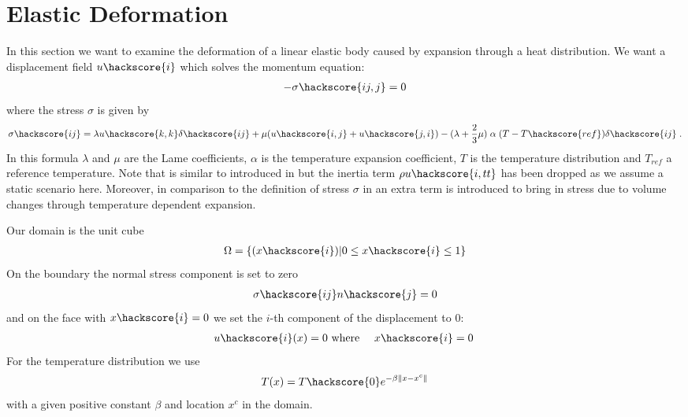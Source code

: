 
%
%
%


\section{Elastic Deformation}
\label{ELASTIC CHAP}
In this section we want to examine the deformation of a linear elastic body caused by expansion through a heat distribution.
We want a displacement field $u\hackscore{i}$ which solves the momentum
equation:
\begin{eqnarray}\label{HEATEDBLOCK general problem}
 - \sigma\hackscore{ij,j}=0
\end{eqnarray}
where the stress $\sigma$ is given by
\begin{eqnarray}\label{HEATEDBLOCK linear elastic}
 \sigma\hackscore{ij}= \lambda u\hackscore{k,k} \delta\hackscore{ij} + \mu ( u\hackscore{i,j} + u\hackscore{j,i})
 - (\lambda+\frac{2}{3} \mu)  \; \alpha  \;  (T-T\hackscore{ref})\delta\hackscore{ij} \;.
\end{eqnarray}
In this formula $\lambda$ and $\mu$ are the Lame coefficients, $\alpha$ is the
temperature expansion coefficient, $T$ is the temperature distribution and $T_{ref}$ a reference temperature.
Note that  is similar to 
introduced in  but the inertia term $\rho u\hackscore{i,tt}$
has been dropped as we assume a static scenario here.
Moreover, in comparison to the  definition of stress $\sigma$
in  an extra term is introduced to bring in
stress due to volume changes through temperature dependent expansion.

Our domain is the unit cube
\begin{eqnarray} \label{HEATEDBLOCK natural location}
\Omega=\{(x\hackscore{i}) | 0 \le x\hackscore{i} \le 1 \}
\end{eqnarray}
On the boundary the normal stress component is set to zero
\begin{eqnarray} \label{HEATEDBLOCK natural}
\sigma\hackscore{ij}n\hackscore{j}=0
\end{eqnarray}
and on the face with $x\hackscore{i}=0$ we set the $i$-th component of the displacement to $0$:
\begin{eqnarray} \label{HEATEDBLOCK constraint}
u\hackscore{i}(x)=0 & \mbox{ where } & x\hackscore{i}=0 \;
\end{eqnarray}
For the temperature distribution we use
\begin{eqnarray} \label{HEATEDBLOCK temperature}
T(x)= T\hackscore{0} e^{-\beta \|x-x^{c}\|}
\end{eqnarray}
with a given positive constant $\beta$ and location $x^{c}$ in the domain.


